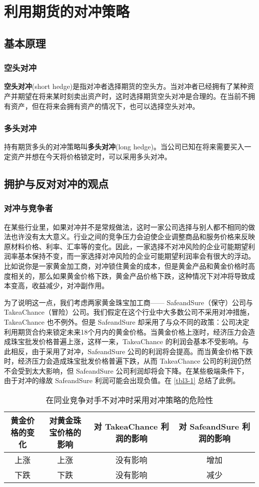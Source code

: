 \chapter{利用期货的对冲策略}
\section{基本原理}
\subsection{空头对冲}
\textbf{空头对冲}(short hedge)是指对冲者选择期货的空头方。当对冲者已经拥有了某种资产并期望在将来某时刻卖出资产时，这时选择期货空头对冲是合理的。在当前不拥有资产，但在将来会拥有资产的情况下，也可以选择空头对冲。
\subsection{多头对冲}
持有期货多头的对冲策略叫\textbf{多头对冲}(long hedge)。当公司已知在将来需要买入一定资产并想在今天将价格锁定时，可以采用多头对冲。
\section{拥护与反对对冲的观点}
\subsection{对冲与竞争者}
在某些行业里，如果对冲并不是常规做法，这时一家公司选择与别人都不相同的做法也许没有太大意义。行业之间的竞争压力会迫使企业调整商品和服务价格来反映原材料价格、利率、汇率等的变化。因此，一家选择不对冲风险的企业可能期望利润率基本保持不变，而一家选择对冲风险的企业可能期望利润率会有很大的浮动。比如说你是一家黄金加工商，对冲锁住黄金的成本，但是黄金产品和黄金价格时高度相关的，那么如果黄金价格下跌，黄金产品价格下跌，这种情况下对冲将导致成本变高，收益减少，对冲副作用。

为了说明这一点，我们考虑两家黄金珠宝加工商—— SafeandSure（保守）公司与 TakeaChance（冒险）公司。我们假定在这个行业中大多数公司不采用对冲措施，TakeaChance 也不例外。但是 SafeandSure 却采用了与众不同的政策：公司决定利用期货合约来锁定未来18个月内的黄金价格。当黄金价格上涨时，经济压力会造成珠宝批发价格普遍上涨，这样一来，TakeaChance 的利润会基本不受影响。与此相反，由于采用了对冲，SafeandSure 公司的利润将会提高。而当黄金价格下跌时，经济压力会造成珠宝批发价格普遍下跌，从而 TakeaChance 公司的利润仍然不会受到太大影响，但 SafeandSure 公司利润却将会下降。在某些极端条件下，由于对冲的缘故 SafeandSure 利润可能会出现负值。在 \autoref{tbl3-1} 总结了此例。
\begin{table}
    \centering
    \caption{在同业竞争对手不对冲时采用对冲策略的危险性}
    \label{tbl3-1}
    \begin{tabular}{cccc}
        \hline
        黄金价格的变化 & 对黄金珠宝价格的影响 & 对 TakeaChance 利润的影响 & 对 SafeandSure 利润的影响 \\
        \hline
        上涨      & 上涨         & 没有影响                & 增加                  \\
        下跌      & 下跌         & 没有影响                & 减少                  \\
        \hline
    \end{tabular}
\end{table}
